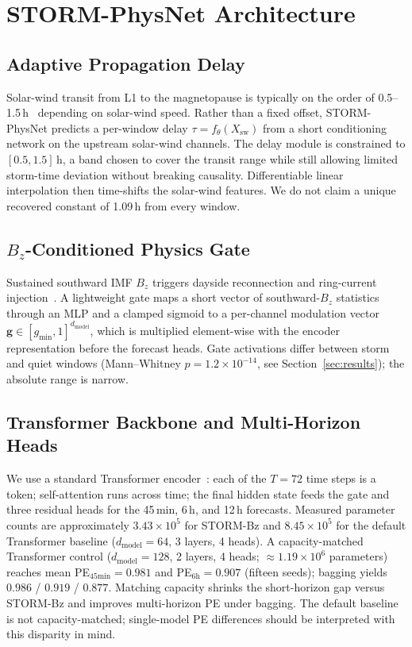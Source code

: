 \documentclass[conference]{IEEEtran}
\begin{document}
\section{STORM-PhysNet Architecture}

\subsection{Adaptive Propagation Delay}
Solar-wind transit from L1 to the magnetopause is typically on the order of 0.5--1.5\,h~\cite{b14} depending on solar-wind speed. Rather than a fixed offset, STORM-PhysNet predicts a per-window delay \(\tau = f_\theta(X_{\mathrm{sw}})\) from a short conditioning network on the upstream solar-wind channels. The delay module is constrained to \([0.5, 1.5]\,\mathrm{h}\), a band chosen to cover the transit range while still allowing limited storm-time deviation without breaking causality. Differentiable linear interpolation then time-shifts the solar-wind features. We do not claim a unique recovered constant of 1.09\,h from every window.

\subsection{\(B_z\)-Conditioned Physics Gate}
Sustained southward IMF \(B_z\) triggers dayside reconnection and ring-current
injection~\cite{b2}. A lightweight gate maps a short vector of
southward-\(B_z\) statistics through an MLP and a clamped sigmoid to a
per-channel modulation vector \(\mathbf{g}\in[g_{\min},1]^{d_{\mathrm{model}}}\), which is multiplied element-wise with the encoder representation
before the forecast heads. Gate activations differ between storm and quiet windows
(Mann--Whitney \(p=1.2\times10^{-14}\), see Section~\ref{sec:results}); the absolute range
is narrow.

\subsection{Transformer Backbone and Multi-Horizon Heads}
We use a standard Transformer encoder~\cite{b16}: each of the \(T=72\)
time steps is a token; self-attention runs across time; the final hidden state
feeds the gate and three residual heads for the 45\,min, 6\,h, and 12\,h
forecasts. Measured parameter counts are approximately $3.43\times10^{5}$ for
STORM-Bz and $8.45\times10^{5}$ for the default Transformer baseline
($d_{\mathrm{model}}=64$, 3 layers, 4 heads). A capacity-matched Transformer
control ($d_{\mathrm{model}}=128$, 2 layers, 4 heads; $\approx1.19\times10^{6}$
parameters) reaches mean PE$_{45\mathrm{min}}=0.981$ and PE$_{6\mathrm{h}}=0.907$
(fifteen seeds); bagging yields $0.986$ / $0.919$ / $0.877$. Matching capacity
shrinks the short-horizon gap versus STORM-Bz and improves multi-horizon PE under
bagging. The default baseline is not capacity-matched; single-model PE differences
should be interpreted with this disparity in mind.
\end{document}
